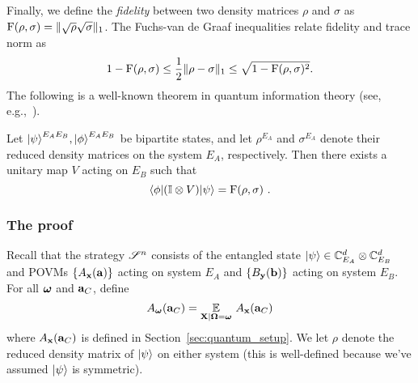 Finally, we define the \emph{fidelity} between two density matrices $\rho$ and $\sigma$ as $\mathrm{F}(\rho,\sigma) = \| \sqrt{\rho} \sqrt{\sigma} \|_1$. The Fuchs-van de Graaf inequalities relate fidelity and trace norm as
\begin{equation}\label{eq:fuchs-graaf}
1 - \mathrm{F}(\rho,\sigma) \leq \frac{1}{2} \| \rho - \sigma \|_1 \leq \sqrt{1 - \mathrm{F}(\rho,\sigma)^2}.
\end{equation}
The following is a well-known theorem in quantum information theory (see, e.g.,~\cite{wilde2013quantum}).
\begin{theorem}
\label{thm:uhlmann}
	Let ${|\psi\rangle}^{E_A E_B},{|\phi\rangle}^{E_A E_B}$ be bipartite states, and let $\rho^{E_A}$ and $\sigma^{E_A}$ denote their reduced density matrices on the system $E_A$, respectively. Then there exists a unitary map $V$ acting on $E_B$ such that
	\[
		{\langle\phi|} (\mathbb{I} \otimes V) {|\psi\rangle} = \mathrm{F}(\rho,\sigma)~.
	\]
\end{theorem}



\subsubsection{The proof}

Recall that the strategy $\mathscr{S}^n$ consists of the entangled state ${|\psi\rangle} \in \mathbb{C}^d_{E_A} \otimes \mathbb{C}^d_{E_B}$ and POVMs $\{A_{\mathbf{x}}(\mathbf{a}) \}$ acting on system $E_A$ and $\{B_{\mathbf{y}}(\mathbf{b}) \}$ acting on system $E_B$. For all ${\boldsymbol{\omega}}$ and $\mathbf{a}_C$, define
\[
	A_{\boldsymbol{\omega}}(\mathbf{a}_C) = \operatorname*{\mathbb{E}}_{\mathbf{X} | {\boldsymbol{\Omega}} = {\boldsymbol{\omega}}} \, A_{\mathbf{x}}(\mathbf{a}_C)
\]
where $A_{\mathbf{x}}(\mathbf{a}_C)$ is defined in Section~\ref{sec:quantum_setup}. 
We let $\rho$ denote the reduced density matrix of ${|\psi\rangle}$ on either system (this is well-defined because we've assumed ${|\psi\rangle}$ is symmetric). 

